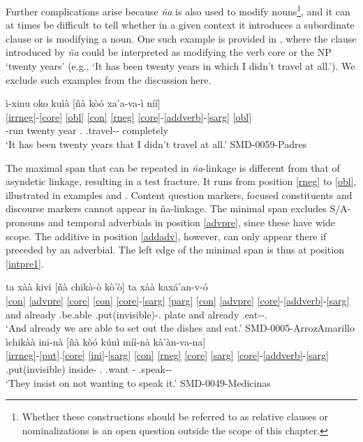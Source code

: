 \documentclass[output=paper]{langscibook}
\begin{document}
Further complications arise because \textit{ña} is also used to modify nouns\footnote{Whether these constructions should be referred to as relative clauses or nominalizations is an open question outside the scope of this chapter.}, and it can at times be difficult to tell whether in a given context it introduces a subordinate clause or is modifying a noun. One such example is provided in , where the clause introduced by \textit{ña} could be interpreted as modifying the verb core or the NP `twenty years' (e.g., `It has been twenty years in which I didn't travel at all.').
We exclude such examples from the discussion here.

\ea \label{ex:naambig}
	\glll  ì-xinu oko kuìà [ñà kòó xa'a-va-ì níí]	\\
	     \ref{irrneg}-\ref{core} \ref{obl} {} \ref{con} \ref{rneg} \ref{core}-\ref{addverb}-\ref{sarg} \ref{obl} \\
		\Cmpl-run twenty year \Compl{} \Neg.\Real{} \Pot.travel-\Add-\Fsg{} completely  \\
	\glt `It has been twenty years that I didn't travel at all.' \hfill SMD-0059-Padres
\z


The maximal span that can be repeated in \textit{ña}-linkage is different from that of asyndetic linkage, resulting in a test fracture. 
It runs from position \ref{rneg} to \ref{obl}, illustrated in examples  and . Content question markers, focused constituents and discourse markers cannot appear in ña-linkage.
The minimal span excludes S/A-pronouns and temporal adverbials in position \ref{advpre}, since these have wide scope. The additive in position \ref{addadv}, however, can only appear there if preceded by an adverbial. The left edge of the minimal span is thus at position \ref{intpre1}. 

\ea
 \ea \label{ex:nalink1}
	\glll ta xàà kivi [ñà chikà-ò kò'ò] ta xàà kaxá'an-v-ó	\\
	    \ref{con} \ref{advpre} \ref{core} \ref{con} \ref{core}-\ref{sarg} \ref{parg} \ref{con} \ref{advpre} \ref{core}-\ref{addverb}-\ref{sarg} \\
		and already \Incmpl.be.able \Compl{} \Pot.put(invisible)-\Fpl.\Incl{} plate and already \Pot.eat-\Add-\Fpl.\Incl{}   \\
	\glt `And already we are able to set out the dishes and eat.' \hfill SMD-0005-ArrozAmarillo
 \ex \label{ex:nalink2}
	\glll ìchikàà ini-nà [ñà kòó kúnì míí-nà kà'àn-va-na]  \\
	       \ref{irrneg}-\ref{put}.\ref{core} \ref{ini}-\ref{sarg} \ref{con} \ref{rneg} \ref{core} \ref{sarg} \ref{core}-\ref{addverb}-\ref{sarg} \\
	       \Cmpl.put(invisible) inside-\Tpl{} \Compl{} \Neg.\Real{} \Incmpl.want \Top-\Tpl{} \Pot.speak-\Add-\Tpl{}  \\
	\glt `They insist on not wanting to speak it.' \hfill SMD-0049-Medicinas
 \z
\z
\end{document}
